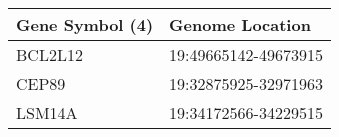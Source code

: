 \begin{tabular}{ll}
\toprule
Gene Symbol (4) &      Genome Location \\
\midrule
        BCL2L12 & 19:49665142-49673915 \\
          CEP89 & 19:32875925-32971963 \\
         LSM14A & 19:34172566-34229515 \\
\bottomrule
\end{tabular}
